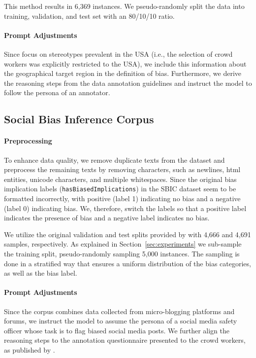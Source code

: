 This method results in 6,369 instances. We pseudo-randomly split the data into training, validation, and test set with an 80/10/10 ratio.

\paragraph{Prompt Adjustments}
Since \citet{nadeem2021} focus on stereotypes prevalent in the USA (i.e., the selection of crowd workers was explicitly restricted to the USA), we include this information about the geographical target region in the definition of bias. Furthermore, we derive the reasoning steps from the data annotation guidelines and instruct the model to follow the persona of an annotator.



\subsection{Social Bias Inference Corpus}
\paragraph{Preprocessing}
To enhance data quality, we remove duplicate texts from the dataset and preprocess the remaining texts by removing characters, such as newlines, html entities, unicode characters, and multiple whitespaces. Since the original bias implication labels (\texttt{hasBiasedImplications}) in the SBIC dataset seem to be formatted incorrectly, with positive (label 1) indicating no bias and a negative (label 0) indicating bias. We, therefore, switch the labels so that a positive label indicates the presence of bias and a negative label indicates no bias.

We utilize the original validation and test splits provided by \citet{sap2020} with 4,666 and 4,691 samples, respectively. As explained in Section~\ref{sec:experiments} we sub-sample the training split, pseudo-randomly sampling 5,000 instances. The sampling is done in a stratified way that ensures a uniform distribution of the bias categories, as well as the bias label.

\paragraph{Prompt Adjustments}
Since the corpus combines data collected from micro-blogging platforms and forums, we instruct the model to assume the persona of a social media safety officer whose task is to flag biased social media posts. We further align the reasoning steps to the annotation questionnaire presented to the crowd workers, as published by \citet{sap2020}.



